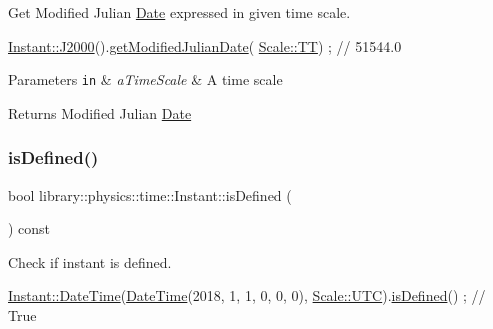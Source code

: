 Get Modified Julian \hyperlink{classlibrary_1_1physics_1_1time_1_1_date}{Date} expressed in given time scale. 


\begin{DoxyCode}
\hyperlink{classlibrary_1_1physics_1_1time_1_1_instant_a2a4f57aa71693b8def06788d55bc3bd3}{Instant::J2000}().\hyperlink{classlibrary_1_1physics_1_1time_1_1_instant_a01a167d6aee17d47ff200b2472199382}{getModifiedJulianDate}(
      \hyperlink{namespacelibrary_1_1physics_1_1time_a09d2bc9fbc7b0b5f92e1419bd655e6bbadf1f3edb9115acb0a1e04209b7a9937b}{Scale::TT}) ; \textcolor{comment}{// 51544.0}
\end{DoxyCode}



\begin{DoxyParams}[1]{Parameters}
\mbox{\tt in}  & {\em a\+Time\+Scale} & A time scale \\
\hline
\end{DoxyParams}
\begin{DoxyReturn}{Returns}
Modified Julian \hyperlink{classlibrary_1_1physics_1_1time_1_1_date}{Date} 
\end{DoxyReturn}
\mbox{\label{classlibrary_1_1physics_1_1time_1_1_instant_aaef81e773a2d3059612b0d99dc7cf661}} 
\subsubsection{\texorpdfstring{is\+Defined()}{isDefined()}}
{\footnotesize\ttfamily bool library\+::physics\+::time\+::\+Instant\+::is\+Defined (\begin{DoxyParamCaption}{ }\end{DoxyParamCaption}) const}



Check if instant is defined. 


\begin{DoxyCode}
\hyperlink{classlibrary_1_1physics_1_1time_1_1_instant_ac827b6ffa57ce75a3c56c462d4c872f8}{Instant::DateTime}(\hyperlink{classlibrary_1_1physics_1_1time_1_1_instant_ac827b6ffa57ce75a3c56c462d4c872f8}{DateTime}(2018, 1, 1, 0, 0, 0), 
      \hyperlink{namespacelibrary_1_1physics_1_1time_a09d2bc9fbc7b0b5f92e1419bd655e6bba9234324ddf6b4176b57d803a925b7961}{Scale::UTC}).\hyperlink{classlibrary_1_1physics_1_1time_1_1_instant_aaef81e773a2d3059612b0d99dc7cf661}{isDefined}() ; \textcolor{comment}{// True}
\end{DoxyCode}


